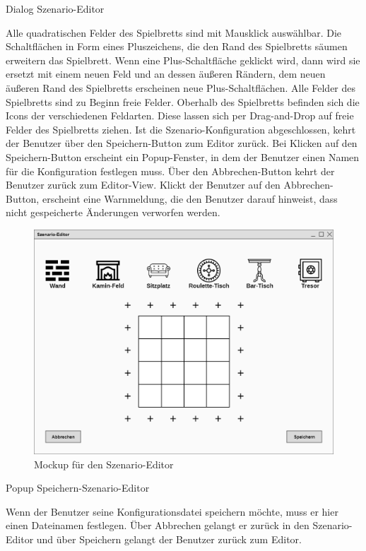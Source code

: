Dialog \glqq{}Szenario-Editor\grqq{}

Alle quadratischen Felder des Spielbretts sind mit Mausklick auswählbar. Die Schaltflächen in Form eines Pluszeichens, die den Rand des Spielbretts säumen erweitern das Spielbrett. Wenn eine Plus-Schaltfläche geklickt wird, dann wird sie ersetzt mit einem neuen Feld und an dessen äußeren Rändern, dem neuen äußeren Rand des Spielbretts erscheinen neue Plus-Schaltflächen. Alle Felder des Spielbretts sind zu Beginn freie Felder. Oberhalb des Spielbretts befinden sich die Icons der verschiedenen Feldarten. Diese lassen sich per Drag-and-Drop auf freie Felder des Spielbretts ziehen. Ist die Szenario-Konfiguration abgeschlossen, kehrt der Benutzer über den Speichern-Button zum Editor zurück. Bei Klicken auf den Speichern-Button erscheint ein Popup-Fenster, in dem der Benutzer einen Namen für die Konfiguration festlegen muss. Über den Abbrechen-Button kehrt der Benutzer zurück zum Editor-View. Klickt der Benutzer auf den Abbrechen-Button, erscheint eine Warnmeldung, die den Benutzer darauf hinweist, dass nicht gespeicherte Änderungen verworfen werden.

\begin{figure}[H]
  \centering
  \includegraphics[width=\textwidth]{Meilenstein03/Szenario-Editor_Mockup.png}
  \caption{Mockup für den Szenario-Editor}
\end{figure}

Popup \glqq{}Speichern-Szenario-Editor\grqq{}

Wenn der Benutzer seine Konfigurationsdatei speichern möchte, muss er hier einen Dateinamen festlegen. Über Abbrechen gelangt er zurück in den Szenario-Editor und über Speichern gelangt der Benutzer zurück zum Editor.

